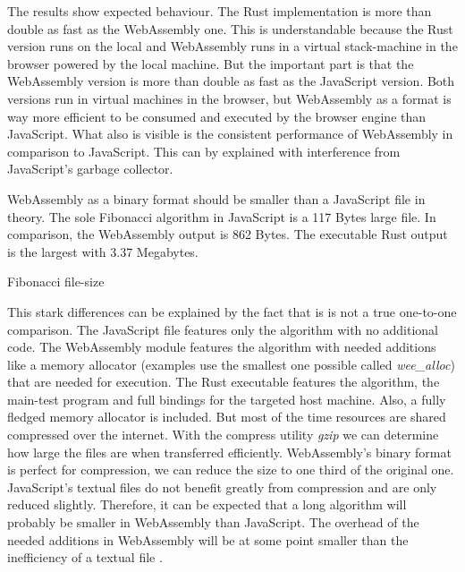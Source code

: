 The results show expected behaviour. The Rust implementation is more than double as fast as the WebAssembly one. This is understandable because the Rust version runs on the local and WebAssembly runs in a virtual stack-machine in the browser powered by the local machine. But the important part is that the WebAssembly version is more than double as fast as the JavaScript version. Both versions run in virtual machines in the browser, but WebAssembly as a format is way more efficient to be consumed and executed by the browser engine than JavaScript. What also is visible is the consistent performance of WebAssembly in comparison to JavaScript. This can by explained with interference from JavaScript's garbage collector.  

WebAssembly as a binary format should be smaller than a JavaScript file in theory. The sole Fibonacci algorithm in JavaScript is a 117 Bytes large file. In comparison, the WebAssembly output is 862 Bytes. The executable Rust output is the largest with 3.37 Megabytes.

\begin{listing}
\begin{center}
\end{center}
\caption{Fibonacci file-size}
\label{lst:fibonacci-filesize}
\end{listing}

This stark differences can be explained by the fact that is is not a true one-to-one comparison. The JavaScript file features only the algorithm with no additional code. The WebAssembly module features the algorithm with needed additions like a memory allocator (examples use the smallest one possible called \textit{wee\_alloc}) that are needed for execution. The Rust executable features the algorithm, the main-test program and full bindings for the targeted host machine. Also, a fully fledged memory allocator is included. But most of the time resources are shared compressed over the internet. With the compress utility \textit{gzip} we can determine how large the files are when transferred efficiently. WebAssembly's binary format is perfect for compression, we can reduce the size to one third of the original one. JavaScript's textual files do not benefit greatly from compression and are only reduced slightly. Therefore, it can be expected that a long algorithm will probably be smaller in WebAssembly than JavaScript. The overhead of the needed additions in WebAssembly will be at some point smaller than the inefficiency of a textual file \cite{wasm:allocator, rust:wasmfilesize}.

